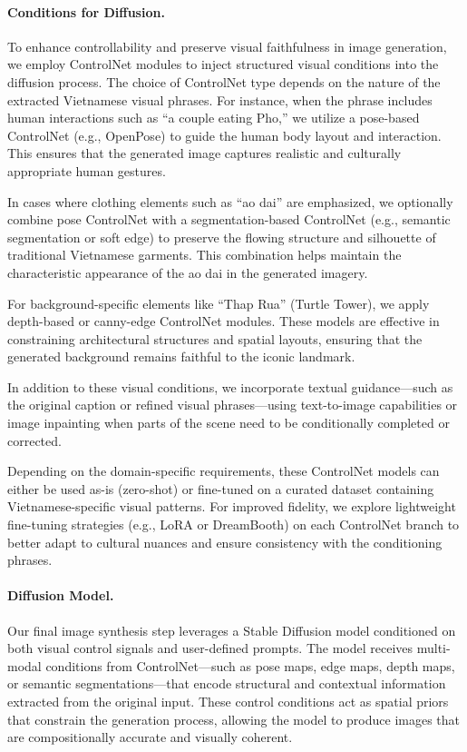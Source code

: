 \documentclass[conference]{IEEEtran}
\begin{document}
\paragraph{Conditions for Diffusion.}
To enhance controllability and preserve visual faithfulness in image generation, we employ ControlNet modules to inject structured visual conditions into the diffusion process. The choice of ControlNet type depends on the nature of the extracted Vietnamese visual phrases. For instance, when the phrase includes human interactions such as ``a couple eating Pho,'' we utilize a pose-based ControlNet (e.g., OpenPose) to guide the human body layout and interaction. This ensures that the generated image captures realistic and culturally appropriate human gestures.

In cases where clothing elements such as ``ao dai'' are emphasized, we optionally combine pose ControlNet with a segmentation-based ControlNet (e.g., semantic segmentation or soft edge) to preserve the flowing structure and silhouette of traditional Vietnamese garments. This combination helps maintain the characteristic appearance of the ao dai in the generated imagery.

For background-specific elements like ``Thap Rua'' (Turtle Tower), we apply depth-based or canny-edge ControlNet modules. These models are effective in constraining architectural structures and spatial layouts, ensuring that the generated background remains faithful to the iconic landmark.

In addition to these visual conditions, we incorporate textual guidance—such as the original caption or refined visual phrases—using text-to-image capabilities or image inpainting when parts of the scene need to be conditionally completed or corrected.

Depending on the domain-specific requirements, these ControlNet models can either be used as-is (zero-shot) or fine-tuned on a curated dataset containing Vietnamese-specific visual patterns. For improved fidelity, we explore lightweight fine-tuning strategies (e.g., LoRA or DreamBooth) on each ControlNet branch to better adapt to cultural nuances and ensure consistency with the conditioning phrases.

\paragraph{Diffusion Model.}
Our final image synthesis step leverages a Stable Diffusion model conditioned on both visual control signals and user-defined prompts. The model receives multi-modal conditions from ControlNet—such as pose maps, edge maps, depth maps, or semantic segmentations—that encode structural and contextual information extracted from the original input. These control conditions act as spatial priors that constrain the generation process, allowing the model to produce images that are compositionally accurate and visually coherent.
\end{document}

